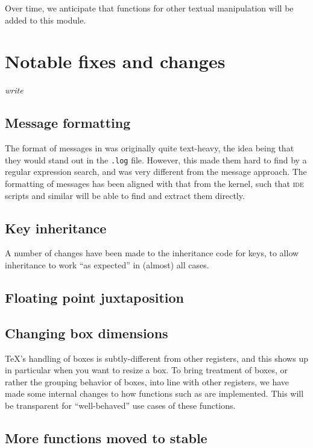 \documentclass{ltnews}
\begin{document}
Over time, we anticipate that functions for other textual manipulation will be
added to this module.

\section{Notable fixes and changes}

\emph{write}

\subsection{Message formatting}

The format of messages in  was originally quite text-heavy, the idea
being that they would stand out in the \texttt{.log} file. However, this made
them hard to find by a regular expression search, and was very different from
the \LaTeXe{} message approach. The formatting of  messages has been
aligned with that from the \LaTeXe{} kernel, such that \textsc{ide} scripts and
similar will be able to find and extract them directly.

\subsection{Key inheritance}

A number of changes have been made to the inheritance code for keys,
to allow inheritance to work \enquote{as expected} in (almost) all
cases.

\subsection{Floating point juxtaposition}


\subsection{Changing box dimensions}

\TeX{}'s handling of boxes is subtly-different from other registers, and this
shows up in particular when you want to resize a box. To bring treatment of
boxes, or rather the grouping behavior of boxes, into line with other
registers, we have made some internal changes to how functions such as
 are implemented. This will be transparent for
\enquote{well-behaved} use cases of these functions.

\subsection{More functions moved to stable}
\end{document}
